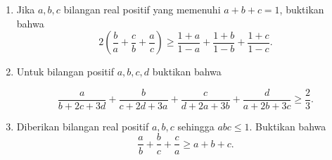 \documentclass[11pt]{scrartcl}
\begin{document}
\begin{enumerate}
\item Jika $a, b, c$ bilangan real positif yang memenuhi $a+b+c=1$, buktikan bahwa
\[2\left(\frac{b}{a}+\frac{c}{b}+\frac{a}{c}\right)\ge\frac{1+a}{1-a}+\frac{1+b}{1-b}+\frac{1+c}{1-c}.\]

\item Untuk bilangan positif $a, b, c, d$ buktikan bahwa

\[\frac{a}{b+2c+3d}+\frac{b}{c+2d+3a}+\frac{c}{d+2a+3b}+\frac{d}{a+2b+3c}\ge\frac{2}{3}.\]

\item Diberikan bilangan real positif $a, b, c$ sehingga $abc \le 1$. Buktikan bahwa
\[\frac{a}{b}+\frac{b}{c}+\frac{c}{a}\ge a+b+c.\]
\end{enumerate}
\end{document}
